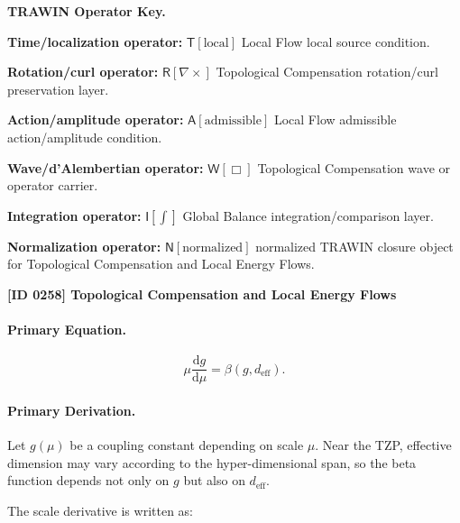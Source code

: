 \par\vspace{0.45\baselineskip}
\noindent\begin{minipage}[t]{\linewidth}
\begingroup
\small
\raggedright
\textbf{TRAWIN Operator Key.}\par
\noindent\textbf{Time/localization operator:} $\mathsf{T}\!\left[\mathrm{local}\right]$ Local Flow local source condition.\par
\noindent\textbf{Rotation/curl operator:} $\mathsf{R}\!\left[\nabla\times\right]$ Topological Compensation rotation/curl preservation layer.\par
\noindent\textbf{Action/amplitude operator:} $\mathsf{A}\!\left[\mathrm{admissible}\right]$ Local Flow admissible action/amplitude condition.\par
\noindent\textbf{Wave/d'Alembertian operator:} $\mathsf{W}\!\left[\Box\right]$ Topological Compensation wave or operator carrier.\par
\noindent\textbf{Integration operator:} $\mathsf{I}\!\left[\int\right]$ Global Balance integration/comparison layer.\par
\noindent\textbf{Normalization operator:} $\mathsf{N}\!\left[\mathrm{normalized}\right]$ normalized TRAWIN closure object for Topological Compensation and Local Energy Flows.\par
\endgroup
\end{minipage}

\clearpage
\noindent\textbf{[ID 0258] Topological Compensation and Local Energy Flows}\par
\vspace{0.35em}
\paragraph{Primary Equation.}
\begin{equation}
\mu\frac{\mathrm{d}g}{\mathrm{d}\mu}
=
\beta(g,d_{\mathrm{eff}}).
\end{equation}

\paragraph{Primary Derivation.}
Let $g(\mu)$ be a coupling constant depending on scale $\mu$.  
Near the TZP, effective dimension may vary according to the hyper-dimensional span, so the beta function depends not only on $g$ but also on $d_{\mathrm{eff}}$.

The scale derivative is written as:

